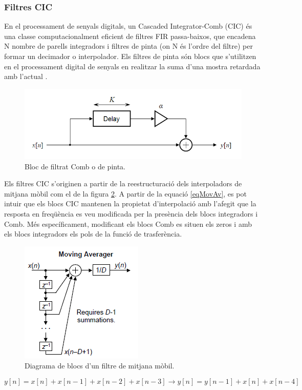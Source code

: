 \subsubsection{Filtres CIC}
\par En el processament de senyals digitals, un Cascaded Integrator-Comb (CIC) és una classe computacionalment eficient de filtres FIR passa-baixos, que encadena N nombre de parells integradors i filtres de pinta (on N és l'ordre del filtre) per formar un decimador o interpolador. Els filtres de pinta són blocs que s'utilitzen en el processament digital de senyals en realitzar la suma d'una mostra retardada amb l'actual \cite{CICLyons}. 
\begin{figure}[H]
    \centering
    \includegraphics[width=0.5\linewidth]{Images/Comb_filter_feedforward.png}
    \caption{Bloc de filtrat Comb o de pinta. \cite{CICLyons}}
    \label{figComb}
\end{figure}
\par Els filtres CIC s'originen a partir de la reestructuració dels interpoladors de mitjana mòbil com el de la figura \ref{figMAFilter}. A partir de la equació \ref{eqMovAv}, es pot intuir que els blocs CIC mantenen la propietat d'interpolació amb l'afegit que la resposta en freqüència es veu modificada per la presència dels blocs integradors i Comb. Més específicament, modificant els blocs Comb es situen els zeros i amb els blocs integradors els pols de la funció de trasferència. 
\begin{figure}[H]
    \centering
    \includegraphics[width=0.3\linewidth]{Images/fir-mvavg-form.png}
    \caption{Diagrama de blocs d'un filtre de mitjana mòbil.}
    \label{figMAFilter}
\end{figure}

\begin{equation}\label{eqMovAv}
    y[n] = x[n] + x[n-1] + x[n-2] + x[n-3] \longrightarrow y[n] = y[n-1] + x[n] + x[n-4]
\end{equation}

